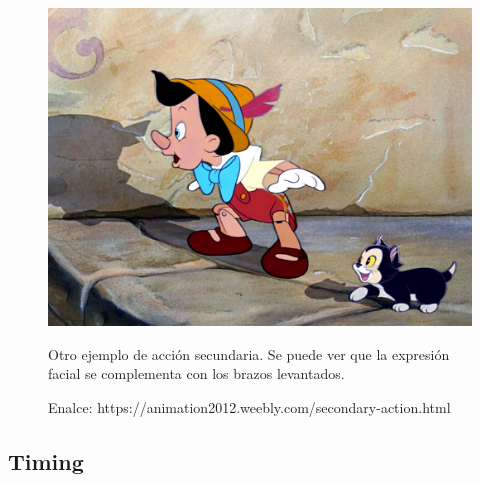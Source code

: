 \documentclass{article}
\begin{document}
\begin{figure}[H]
    \centering
    \includegraphics[width=\textwidth]{imagenes/sec-ac.jpg}
    \caption{Otro ejemplo de acción secundaria. Se puede ver que la expresión facial se complementa con los brazos levantados.}
    \caption{Enalce: https://animation2012.weebly.com/secondary-action.html}
\end{figure}
\subsection{Timing}
\end{document}
